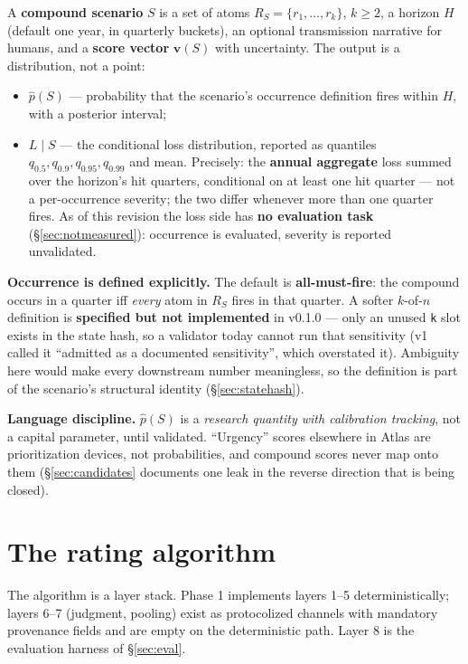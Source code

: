 \documentclass[11pt]{article}
\begin{document}
A \textbf{compound scenario} $S$ is a set of atoms
$R_S = \{r_1,\dots,r_k\}$, $k \ge 2$, a horizon $H$ (default one year, in
quarterly buckets), an optional transmission narrative for humans, and a
\textbf{score vector} $\mathbf{v}(S)$ with uncertainty. The output is a
distribution, not a point:

\begin{itemize}[leftmargin=1.4em]
\item $\hat p(S)$ --- probability that the scenario's occurrence definition
  fires within $H$, with a posterior interval;
\item $L \mid S$ --- the conditional loss distribution, reported as
  quantiles $q_{0.5}, q_{0.9}, q_{0.95}, q_{0.99}$ and mean. Precisely: the
  \textbf{annual aggregate} loss summed over the horizon's hit quarters,
  conditional on at least one hit quarter --- not a per-occurrence severity;
  the two differ whenever more than one quarter fires. As of this revision
  the loss side has \textbf{no evaluation task} (\S\ref{sec:notmeasured}):
  occurrence is evaluated, severity is reported unvalidated.
\end{itemize}

\textbf{Occurrence is defined explicitly.} The default is
\textbf{all-must-fire}: the compound occurs in a quarter iff \emph{every}
atom in $R_S$ fires in that quarter. A softer $k$-of-$n$ definition is
\textbf{specified but not implemented} in v0.1.0 --- only an unused
\texttt{k} slot exists in the state hash, so a validator today cannot run
that sensitivity (v1 called it ``admitted as a documented sensitivity'',
which overstated it). Ambiguity here would make every downstream number
meaningless, so the definition is part of the scenario's structural identity
(\S\ref{sec:statehash}).

\textbf{Language discipline.} $\hat p(S)$ is a \emph{research quantity with
calibration tracking}, not a capital parameter, until validated. ``Urgency''
scores elsewhere in Atlas are prioritization devices, not probabilities, and
compound scores never map onto them (\S\ref{sec:candidates} documents one
leak in the reverse direction that is being closed).

\section{The rating algorithm}
\label{sec:algorithm}

The algorithm is a layer stack. Phase 1 implements layers 1--5
deterministically; layers 6--7 (judgment, pooling) exist as protocolized
channels with mandatory provenance fields and are empty on the deterministic
path. Layer 8 is the evaluation harness of \S\ref{sec:eval}.
\end{document}
